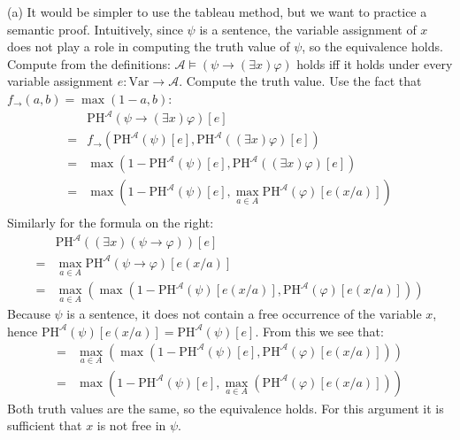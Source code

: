 \begin{problem}
\begin{solution}
        (a) It would be simpler to use the tableau method, but we want to practice a semantic proof. Intuitively, since $\psi$ is a sentence, the variable assignment of $x$ does not play a role in computing the truth value of $\psi$, so the equivalence holds. Compute from the definitions: $\mathcal{A}\models (\psi \to (\exists x)\varphi)$ holds iff it holds under every variable assignment $e:\mathrm{Var}\to\mathcal A$. Compute the truth value. Use the fact that $f_\to(a,b)=\max(1-a,b)$:
            \begin{align*}
                &\mathrm{PH}^\mathcal A(\psi \to (\exists x)\varphi)[e]\\
                =&f_\to(\mathrm{PH}^\mathcal A(\psi)[e], \mathrm{PH}^\mathcal A((\exists x)\varphi)[e])\\
                =&\max(1-\mathrm{PH}^\mathcal A(\psi)[e], \mathrm{PH}^\mathcal A((\exists x)\varphi)[e])\\
                =&\max(1-\mathrm{PH}^\mathcal A(\psi)[e], \max_{a\in A}\mathrm{PH}^\mathcal A(\varphi)[e(x/a)])\\                
            \end{align*}
            Similarly for the formula on the right:
            \begin{align*}
                &\mathrm{PH}^\mathcal A((\exists x)(\psi \to \varphi))[e]\\
                =&\max_{a\in A}\mathrm{PH}^\mathcal A(\psi \to \varphi)[e(x/a)]\\
                =&\max_{a\in A}(\max(1-\mathrm{PH}^\mathcal A(\psi)[e(x/a)], \mathrm{PH}^\mathcal A(\varphi)[e(x/a)]))
            \end{align*}
            Because $\psi$ is a sentence, it does not contain a free occurrence of the variable $x$, hence $\mathrm{PH}^\mathcal A(\psi)[e(x/a)]=\mathrm{PH}^\mathcal A(\psi)[e]$. From this we see that:
            \begin{align*}
                =&\max_{a\in A}(\max(1-\mathrm{PH}^\mathcal A(\psi)[e], \mathrm{PH}^\mathcal A(\varphi)[e(x/a)]))\\
                =&\max(1-\mathrm{PH}^\mathcal A(\psi)[e], \max_{a\in A}(\mathrm{PH}^\mathcal A(\varphi)[e(x/a)]))
            \end{align*}
            Both truth values are the same, so the equivalence holds. For this argument it is sufficient that $x$ is not free in $\psi$. 
            

\end{solution}
\end{problem}
